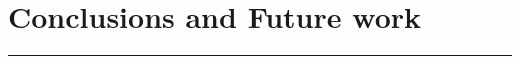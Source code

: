 \chapter{Conclusions and Future work} \label{ch:conclusions}
\todo

\noindent\rule{\textwidth}{0.4mm}